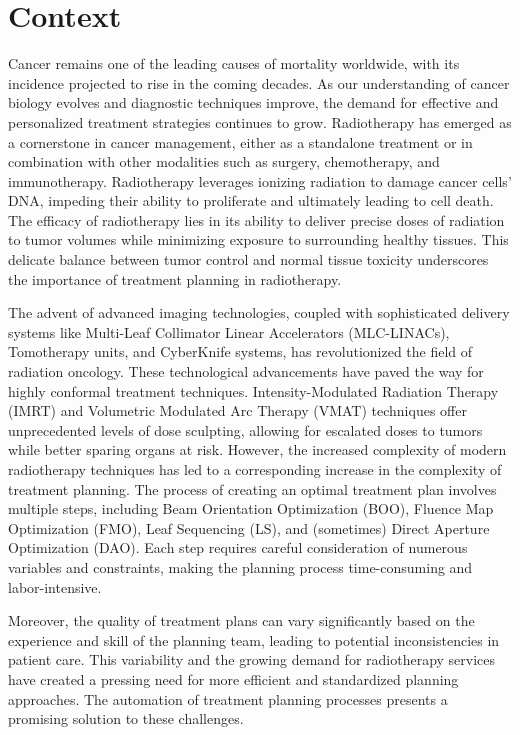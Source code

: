 \section{Context}
Cancer remains one of the leading causes of mortality worldwide, with its incidence projected to rise in the coming decades.
As our understanding of cancer biology evolves and diagnostic techniques improve, the demand for effective and personalized treatment strategies continues to grow.
Radiotherapy has emerged as a cornerstone in cancer management, either as a standalone treatment or in combination with other modalities such as surgery, chemotherapy, and immunotherapy.
Radiotherapy leverages ionizing radiation to damage cancer cells' DNA, impeding their ability to proliferate and ultimately leading to cell death.
The efficacy of radiotherapy lies in its ability to deliver precise doses of radiation to tumor volumes while minimizing exposure to surrounding healthy tissues.
This delicate balance between tumor control and normal tissue toxicity underscores the importance of treatment planning in radiotherapy.

The advent of advanced imaging technologies, coupled with sophisticated delivery systems like Multi-Leaf Collimator Linear Accelerators (MLC-LINACs), Tomotherapy units, and CyberKnife systems, has revolutionized the field of radiation oncology.
These technological advancements have paved the way for highly conformal treatment techniques.
Intensity-Modulated Radiation Therapy (IMRT) and Volumetric Modulated Arc Therapy (VMAT) techniques offer unprecedented levels of dose sculpting, allowing for escalated doses to tumors while better sparing organs at risk.
However, the increased complexity of modern radiotherapy techniques has led to a corresponding increase in the complexity of treatment planning.
The process of creating an optimal treatment plan involves multiple steps, including Beam Orientation Optimization (BOO), Fluence Map Optimization (FMO), Leaf Sequencing (LS), and (sometimes) Direct Aperture Optimization (DAO).
Each step requires careful consideration of numerous variables and constraints, making the planning process time-consuming and labor-intensive.

Moreover, the quality of treatment plans can vary significantly based on the experience and skill of the planning team, leading to potential inconsistencies in patient care.
This variability and the growing demand for radiotherapy services have created a pressing need for more efficient and standardized planning approaches.
The automation of treatment planning processes presents a promising solution to these challenges.

